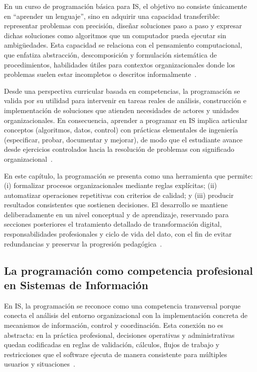 \documentclass[12pt,twoside]{book}
\begin{document}
				En un curso de programación básica para IS, el objetivo no consiste únicamente en “aprender un lenguaje”, sino en adquirir una capacidad transferible: representar problemas con precisión, diseñar soluciones paso a paso y expresar dichas soluciones como algoritmos que un computador pueda ejecutar sin ambigüedades. Esta capacidad se relaciona con el pensamiento computacional, que enfatiza abstracción, descomposición y formulación sistemática de procedimientos, habilidades útiles para contextos organizacionales donde los problemas suelen estar incompletos o descritos informalmente~\cite{Wing2006Computational,Perkovic2010Framework,Futschek2006Algorithmic}.
				
				Desde una perspectiva curricular basada en competencias, la programación se valida por su utilidad para intervenir en tareas reales de análisis, construcción e implementación de soluciones que atienden necesidades de actores y unidades organizacionales. En consecuencia, aprender a programar en IS implica articular conceptos (algoritmos, datos, control) con prácticas elementales de ingeniería (especificar, probar, documentar y mejorar), de modo que el estudiante avance desde ejercicios controlados hacia la resolución de problemas con significado organizacional~\cite{Leidig2021Competency,Leidig2020Updating,Laudon2020Management}.
				
				En este capítulo, la programación se presenta como una herramienta que permite: (i) formalizar procesos organizacionales mediante reglas explícitas; (ii) automatizar operaciones repetitivas con criterios de calidad; y (iii) producir resultados consistentes que sostienen decisiones. El desarrollo se mantiene deliberadamente en un nivel conceptual y de aprendizaje, reservando para secciones posteriores el tratamiento detallado de transformación digital, responsabilidades profesionales y ciclo de vida del dato, con el fin de evitar redundancias y preservar la progresión pedagógica~\cite{Kendall2014Systems,Tegarden2025Systems,Laudon2020Management}.
				
				\subsection{La programación como competencia profesional en Sistemas de Información}
					\noindent
					En IS, la programación se reconoce como una competencia transversal porque conecta el análisis del entorno organizacional con la implementación concreta de mecanismos de información, control y coordinación. Esta conexión no es abstracta: en la práctica profesional, decisiones operativas y administrativas quedan codificadas en reglas de validación, cálculos, flujos de trabajo y restricciones que el software ejecuta de manera consistente para múltiples usuarios y situaciones~\cite{Laudon2020Management,Kendall2014Systems,Tegarden2025Systems}.
					
\end{document}
